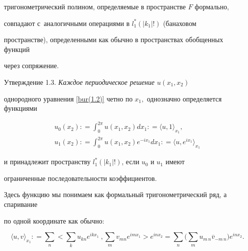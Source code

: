 тригонометрический полином, определяемые в пространстве $F$ формально,

совпадают с~аналогичными операциями в $l_1^* (|k_1| !)$ (банаховом

пространстве), определенными как обычно в пространствах обобщенных функций

через сопряжение.



\smallskip







\hypertarget{bur:utv:1.3}{}



{\small\sc Утверждение  1.3.} \it Каждое периодическое решение $u (x_1, x_2)$

однородного уравнения \eqref{bur(1.2)} четно по $x_1,$ однозначно определяется функциями

\begin{gather}

u_0 (x_2) : = \int_0^{2 \pi} u (x_1, x_2) d x_1 : = \langle u, 1 \rangle _{x_1},

\\

u_1 (x_2) : = \int_0^{2 \pi} u (x_1, x_2) e^{- i x_1} d x_1 : = \langle  u, e^{i x_1}

\rangle_{x_1}

\end{gather}

и принадлежит пространству $l_1^* (|k_1| !)$, если $u_0$ и $u_1$ имеют

ограниченные последовательности коэффициентов\rm.

\smallskip





Здесь функцию мы понимаем как формальный тригонометрический ряд, а спаривание

по одной координате как обычно:

\begin{equation}

\langle u, v \rangle _{x_1} : = \sum_n \biggl <\sum_k u_{kn} e^{i k x_1}\ ,

\sum_m v_{mn} e^{i m x_1} \biggr > e^{inx_2} 

= \sum_n \biggl ( \sum_m u_{m\,n} \overline v_{-m\,n} \biggr )

e^{i n x_2}.

\end{equation}

